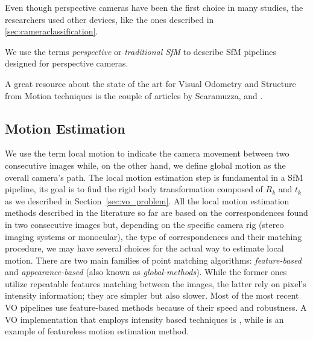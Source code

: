 Even though perspective cameras have been the first choice in many studies, 
the researchers used other devices, like the ones described in 
\ref{sec:cameraclassification}.

We use the terms \textit{perspective} or \textit{traditional SfM} to describe 
SfM pipelines designed for perspective cameras.

A great resource about the state of the art for Visual Odometry and Structure 
from Motion techniques is the couple of articles by Scaramuzza,  
\cite{scaramuzzaVisualOdometryI} and \cite{scaramuzzaVisualOdometryII}.

\subsection{Motion Estimation}
\label{subsec:motion_estimation}
We use the term local motion to indicate the camera movement between two 
consecutive images while, on the other hand, we define global motion as
the overall camera's path.
The local motion estimation step is fundamental in a SfM pipeline, its goal is 
to find the rigid body transformation composed of $R_k$ and $t_k$ as we 
described in Section~\ref{sec:vo_problem}.
All the local motion estimation methods described in the literature so far are 
based on the correspondences found in two consecutive images but, depending on the
specific camera rig (stereo imaging systems or monocular), the type of 
correspondences and their matching procedure, we may have several choices for
the actual way to estimate local motion.
There are two main families of point matching algorithms: \textit{feature-based}
and \textit{appearance-based} (also known as \textit{global-methods}).
While the former ones utilize repeatable features 
matching between the images, the latter rely on pixel's intensity information; 
they are simpler but also slower. Most of the 
most recent VO pipelines use feature-based methods because of
their speed and robustness.
A VO implementation that employs intensity based techniques is 
\cite{nister2004visual}, while \cite{makadia2007correspondence} is an example 
of featureless motion estimation method.

